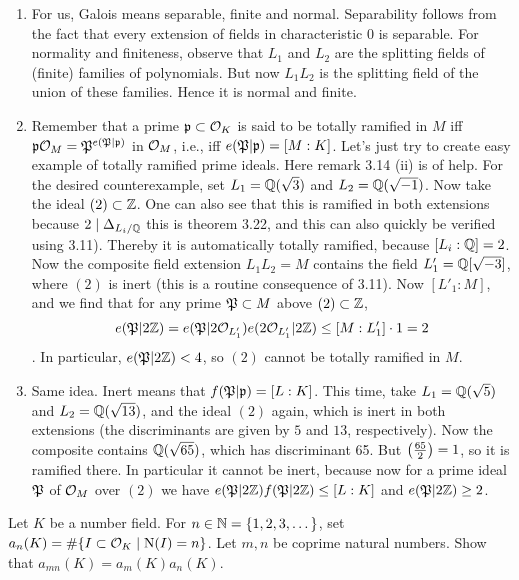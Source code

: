 \documentclass[a4paper,11pt]{article}
\begin{document}
\begin{enumerate}[labelindent=0pt, wide]
    \item For us, Galois means separable, finite and normal. Separability
        follows from the fact
        that every extension of fields in characteristic $0$ is separable.
        For normality and finiteness,
        observe that $L_1$ and $L_2$ are the splitting fields of (finite)
        families of polynomials. But now $L_1L_2$ is the splitting field of the
        union of these families. Hence it is normal and finite.
    \item Remember that a prime $\mathfrak{p} \subset \mathcal{O}_K$ is said to be totally ramified in 
        $M$ iff $\mathfrak{p} \mathcal{O}_M = \mathfrak{P}^{e(\mathfrak{P}|\mathfrak{p})}$ in $\mathcal{O}_M$, i.e., iff
        $e(\mathfrak{P}|\mathfrak{p}) = [M:K]$. Let's just try to create easy example of totally
        ramified prime ideals. Here remark 3.14 (ii) is of help. For the
        desired counterexample, set $L_1 = \mathbb{Q}(\sqrt 3)$ and $L_2 = \mathbb{Q}(\sqrt
        {-1})$. Now take the ideal $(2) \subset \mathbb{Z}$. One can also see that this
        is ramified in both extensions because $2 \mid \Delta_{L_i/\mathbb{Q}}$ this is
        theorem 3.22, and this can also quickly be verified using 3.11).
        Thereby it is automatically totally ramified, because $[L_i : \mathbb{Q}] = 2$.
        Now the composite field extension $L_1 L_2 = M$ contains the field
        $L'_1 = \mathbb{Q}[\sqrt{-3}]$, where $(2)$ is inert (this is a routine
        consequence of 3.11). Now $[L'_1: M]$, and we find that for any prime
        $\mathfrak{P}\subset M$ above $(2) \subset \mathbb{Z}$, $$e(\mathfrak{P}|2\mathbb{Z}) =
        e(\mathfrak{P}|2\mathcal{O}_{L'_1})e(2\mathcal{O}_{L'_1}|2\mathbb{Z}) \leq [M:L'_1] \cdot 1 = 2$$. In
        particular, $e(\mathfrak{P}|2\mathbb{Z}) < 4$, so $(2)$ cannot be totally ramified in $M$.
    \item Same idea. Inert means that 
        $f(\mathfrak{P}|\mathfrak{p}) = [L:K]$. This time, take $L_1 = \mathbb{Q}(\sqrt 5)$ and $L_2 =
        \mathbb{Q}(\sqrt {13})$, and the ideal $(2)$ again, which is inert in both
        extensions (the discriminants are given by $5$ and $13$, respectively).
        Now the composite contains $\mathbb{Q}(\sqrt{65})$, which has discriminant 65.
        But $\left( \frac{65}{2} \right) = 1$, so it is ramified there. In particular it
        cannot be inert, because now for a prime ideal $\mathfrak{P}$ of $\mathcal{O}_M$ over $(2)$ 
        we have $e(\mathfrak{P}|2\mathbb{Z})f(\mathfrak{P}|2\mathbb{Z}) \leq [L:K]$ and $e(\mathfrak{P}|2\mathbb{Z}) \geq 2$. 

    
\end{enumerate}

Let $K$ be a number field. For $n \in \mathbb{N} = \{1,2,3, \dots\}$, set 
$a_n(K) = \#\{I \subset \mathcal{O}_K \mid \operatorname{N}(I) = n\}$. Let $m,n$ be coprime natural numbers.
Show that $a_{mn}(K) = a_m(K)a_n(K)$.
\end{document}
